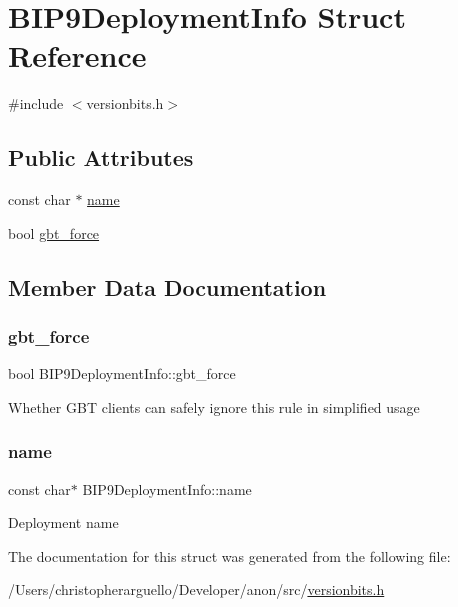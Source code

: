 \hypertarget{struct_b_i_p9_deployment_info}{}\section{B\+I\+P9\+Deployment\+Info Struct Reference}
\label{struct_b_i_p9_deployment_info}


{\ttfamily \#include $<$versionbits.\+h$>$}

\subsection*{Public Attributes}
\begin{DoxyCompactItemize}
\item 
const char $\ast$ \mbox{\hyperlink{struct_b_i_p9_deployment_info_a7878228bb4850d21502a8206fb74ba39}{name}}
\item 
bool \mbox{\hyperlink{struct_b_i_p9_deployment_info_ae3b03f5571b6ac2ea577192d6782391c}{gbt\+\_\+force}}
\end{DoxyCompactItemize}


\subsection{Member Data Documentation}
\mbox{\label{struct_b_i_p9_deployment_info_ae3b03f5571b6ac2ea577192d6782391c}} 
\subsubsection{\texorpdfstring{gbt\+\_\+force}{gbt\_force}}
{\footnotesize\ttfamily bool B\+I\+P9\+Deployment\+Info\+::gbt\+\_\+force}

Whether G\+BT clients can safely ignore this rule in simplified usage \mbox{\label{struct_b_i_p9_deployment_info_a7878228bb4850d21502a8206fb74ba39}} 
\subsubsection{\texorpdfstring{name}{name}}
{\footnotesize\ttfamily const char$\ast$ B\+I\+P9\+Deployment\+Info\+::name}

Deployment name 

The documentation for this struct was generated from the following file\+:\begin{DoxyCompactItemize}
\item 
/\+Users/christopherarguello/\+Developer/anon/src/\mbox{\hyperlink{versionbits_8h}{versionbits.\+h}}\end{DoxyCompactItemize}
